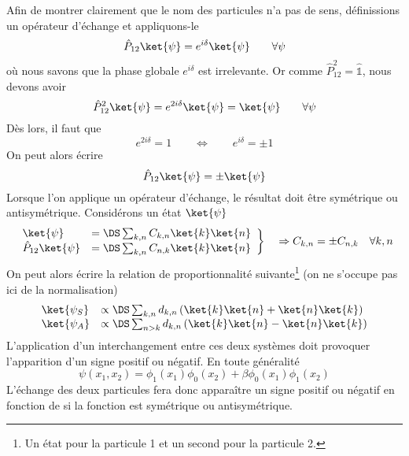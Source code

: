 Afin de montrer clairement que le nom des particules n'a pas de sens, définissions un opérateur 
d'échange et appliquons-le
\begin{equation}
\hat{P}_{12} \ket{\psi} = e^{i\delta}\ket{\psi}\qquad\forall\psi
\end{equation}
où nous savons que la phase globale $e^{i\delta}$ est irrelevante. Or comme $\hat{P}_{12}^2=
\hat{\mathbb{1}}$, nous devons avoir
\begin{equation}
\hat{P}_{12}^2 \ket{\psi} = e^{2i\delta}\ket{\psi}=\ket{\psi}\qquad\forall\psi
\end{equation}
Dès lors, il faut que
\begin{equation}
e^{2i\delta} = 1\qquad\Leftrightarrow\qquad e^{i\delta}=\pm1
\end{equation}
On peut alors écrire
\begin{equation}
\hat{P}_{12}\ket{\psi} = \pm\ket{\psi}
\end{equation}
Lorsque l'on applique un opérateur d'échange, le résultat doit être symétrique ou antisymétrique. 
Considérons un état $\ket{\psi}$
\begin{equation}
\left.\begin{array}{ll}
\ket{\psi} &=\DS \sum_{k,n}C_{k,n}\ket{k}\ket{n}\\
\hat{P}_{12}\ket{\psi} &=\DS \sum_{k,n}C_{n,k}\ket{k}\ket{n}
\end{array}\right\}\quad\Rightarrow C_{k,n} = \pm C_{n,k}\quad \forall k,n
\end{equation}
On peut alors écrire la relation de proportionnalité suivante\footnote{Un état pour la particule 1 et un
second pour la particule 2.} (on ne s'occupe pas ici de la normalisation)
\begin{equation}
\begin{array}{ll}
\ket{\psi_S} &\propto\DS \sum_{k,n} d_{k,n}\left(\ket{k}\ket{n}+\ket{n}\ket{k}\right)\\
\ket{\psi_A} &\propto\DS \sum_{n>k} d_{k,n}\left(\ket{k}\ket{n}-\ket{n}\ket{k}\right)
\end{array}
\end{equation}
L’application d'un interchangement entre ces deux systèmes doit provoquer l'apparition d'un 
signe positif ou négatif. En toute généralité
\begin{equation}
\psi(x_1,x_2) = \phi_1(x_1)\phi_0(x_2) + \beta \phi_0(x_1)\phi_1(x_2)
\end{equation} 
L'échange des deux particules fera donc apparaître un signe positif ou négatif en fonction de si 
la fonction est symétrique ou antisymétrique.\\

